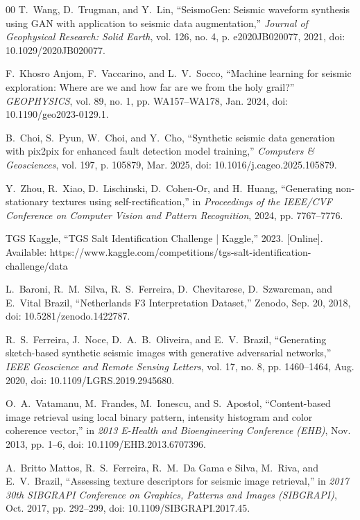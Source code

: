\documentclass{ieeeaccess}
\begin{document}
\begin{thebibliography}{00}
T.~Wang, D.~Trugman, and Y.~Lin, ``SeismoGen: Seismic waveform synthesis using GAN with application to seismic data augmentation,'' \emph{Journal of Geophysical Research: Solid Earth}, vol. 126, no. 4, p. e2020JB020077, 2021, doi: 10.1029/2020JB020077.

F.~Khosro Anjom, F.~Vaccarino, and L.~V.~Socco, ``Machine learning for seismic exploration: Where are we and how far are we from the holy grail?'' \emph{GEOPHYSICS}, vol. 89, no. 1, pp. WA157--WA178, Jan. 2024, doi: 10.1190/geo2023-0129.1.

B.~Choi, S.~Pyun, W.~Choi, and Y.~Cho, ``Synthetic seismic data generation with pix2pix for enhanced fault detection model training,'' \emph{Computers \& Geosciences}, vol. 197, p. 105879, Mar. 2025, doi: 10.1016/j.cageo.2025.105879.

Y.~Zhou, R.~Xiao, D.~Lischinski, D.~Cohen-Or, and H.~Huang, ``Generating non-stationary textures using self-rectification,'' in \emph{Proceedings of the IEEE/CVF Conference on Computer Vision and Pattern Recognition}, 2024, pp. 7767--7776.

TGS Kaggle, ``TGS Salt Identification Challenge | Kaggle,'' 2023. [Online]. Available: https://www.kaggle.com/competitions/tgs-salt-identification-challenge/data

L.~Baroni, R.~M.~Silva, R.~S.~Ferreira, D.~Chevitarese, D.~Szwarcman, and E.~Vital Brazil, ``Netherlands F3 Interpretation Dataset,'' Zenodo, Sep. 20, 2018, doi: 10.5281/zenodo.1422787.

R.~S.~Ferreira, J.~Noce, D.~A.~B.~Oliveira, and E.~V.~Brazil, ``Generating sketch-based synthetic seismic images with generative adversarial networks,'' \emph{IEEE Geoscience and Remote Sensing Letters}, vol. 17, no. 8, pp. 1460--1464, Aug. 2020, doi: 10.1109/LGRS.2019.2945680.

O.~A.~Vatamanu, M.~Frandes, M.~Ionescu, and S.~Apostol, ``Content-based image retrieval using local binary pattern, intensity histogram and color coherence vector,'' in \emph{2013 E-Health and Bioengineering Conference (EHB)}, Nov. 2013, pp. 1--6, doi: 10.1109/EHB.2013.6707396.

A.~Britto Mattos, R.~S.~Ferreira, R.~M.~Da Gama e Silva, M.~Riva, and E.~V.~Brazil, ``Assessing texture descriptors for seismic image retrieval,'' in \emph{2017 30th SIBGRAPI Conference on Graphics, Patterns and Images (SIBGRAPI)}, Oct. 2017, pp. 292--299, doi: 10.1109/SIBGRAPI.2017.45.

\end{thebibliography}
\end{document}
